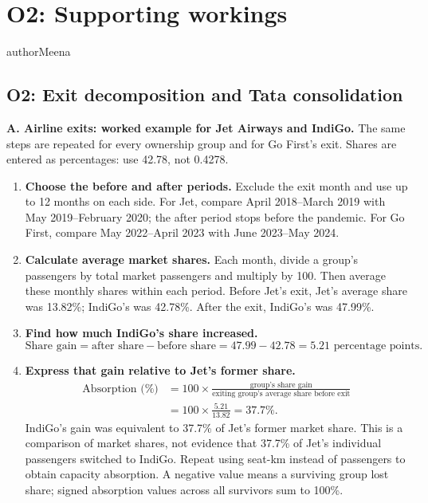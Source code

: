 \clearpage
\section{O2: Supporting workings}
\label{app:workings}
\begin{mergedcontribution}{authorMeena}
\subsection*{O2: Exit decomposition and Tata consolidation}
\textbf{A. Airline exits: worked example for Jet Airways and IndiGo.}
The same steps are repeated for every ownership group and for Go First's exit. Shares are entered as percentages: use 42.78, not 0.4278.
\begin{enumerate}[leftmargin=2em]
	\item \textbf{Choose the before and after periods.} Exclude the exit month and use up to 12 months on each side. For Jet, compare April 2018--March 2019 with May 2019--February 2020; the after period stops before the pandemic. For Go First, compare May 2022--April 2023 with June 2023--May 2024.

	\item \textbf{Calculate average market shares.} Each month, divide a group's passengers by total market passengers and multiply by 100. Then average these monthly shares within each period. Before Jet's exit, Jet's average share was 13.82\%; IndiGo's was 42.78\%. After the exit, IndiGo's was 47.99\%.

	\item \textbf{Find how much IndiGo's share increased.}
	\[
	\text{Share gain} = \text{after share} - \text{before share}
	= 47.99 - 42.78 = 5.21\text{ percentage points}.
	\]

	\item \textbf{Express that gain relative to Jet's former share.}
	\[
	\begin{aligned}
	\text{Absorption (\%)} &= 100\times\frac{\text{group's share gain}}{\text{exiting group's average share before exit}}\\
	&= 100\times\frac{5.21}{13.82} = 37.7\%.
	\end{aligned}
	\]
	IndiGo's gain was equivalent to 37.7\% of Jet's former market share. This is a comparison of market shares, not evidence that 37.7\% of Jet's individual passengers switched to IndiGo. Repeat using seat-km instead of passengers to obtain capacity absorption. A negative value means a surviving group lost share; signed absorption values across all survivors sum to 100\%.


\end{enumerate}
\end{mergedcontribution}
